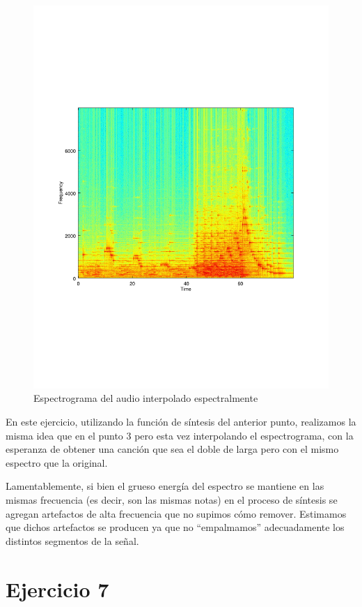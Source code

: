 \documentclass[paper=a4, fontsize=11pt]{scrartcl} %
\numberwithin{equation}{section} %
\numberwithin{figure}{section} %
\numberwithin{table}{section} %
\begin{document}
\begin{figure}[t!]
\includegraphics[width=\textwidth]{../images/specgram_6_interpolated.pdf}
\caption{Espectrograma del audio interpolado espectralmente}
\label{audio_interpolado_espectralmente}
\end{figure}

En este ejercicio, utilizando la función de síntesis del anterior punto, realizamos la misma idea que en el punto 3 pero esta vez interpolando el espectrograma, con la esperanza de obtener una canción que sea el doble de larga pero con el mismo espectro que la original.

Lamentablemente, si bien el grueso energía del espectro se mantiene en las mismas frecuencia (es decir, son las mismas notas) en el proceso de síntesis se agregan artefactos de alta frecuencia que no supimos cómo remover. Estimamos que dichos artefactos se producen ya que no ``empalmamos'' adecuadamente los distintos segmentos de la señal.


\section{Ejercicio 7}
\end{document}
